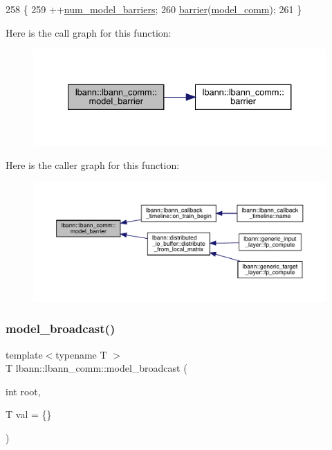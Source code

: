 \begin{DoxyCode}
258                                \{
259   ++\hyperlink{classlbann_1_1lbann__comm_aa4f15459eca2a06174a877ba0c23feb7}{num\_model\_barriers};
260   \hyperlink{classlbann_1_1lbann__comm_a303c02c5a127f3ed21f12c9a71cc90a6}{barrier}(\hyperlink{classlbann_1_1lbann__comm_a58a75b76bd61ec8a26c1cbbec3dc2f45}{model\_comm});
261 \}
\end{DoxyCode}
Here is the call graph for this function\+:\nopagebreak
\begin{figure}[H]
\begin{center}
\leavevmode
\includegraphics[width=334pt]{classlbann_1_1lbann__comm_a6086ced12c3eefeea6e2a78eff286983_cgraph}
\end{center}
\end{figure}
Here is the caller graph for this function\+:\nopagebreak
\begin{figure}[H]
\begin{center}
\leavevmode
\includegraphics[width=350pt]{classlbann_1_1lbann__comm_a6086ced12c3eefeea6e2a78eff286983_icgraph}
\end{center}
\end{figure}
\mbox{\label{classlbann_1_1lbann__comm_a929f44a9a9563ae9e4ffe7d44235a195}} 
\subsubsection{\texorpdfstring{model\+\_\+broadcast()}{model\_broadcast()}}
{\footnotesize\ttfamily template$<$typename T $>$ \\
T lbann\+::lbann\+\_\+comm\+::model\+\_\+broadcast (\begin{DoxyParamCaption}\item[{int}]{root,  }\item[{T}]{val = {\ttfamily \{\}} }\end{DoxyParamCaption})\hspace{0.3cm}{\ttfamily [inline]}}

